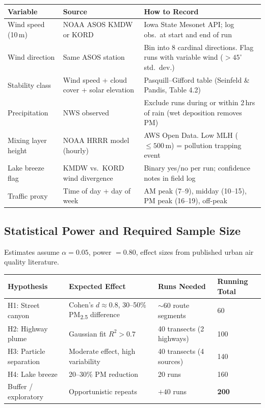 \documentclass[11pt, letterpaper]{article}
\begin{document}
\medskip
\begin{center}
\begin{tabular}{L{3.2cm} L{3.8cm} L{6.0cm}}
\toprule
{}
\color{white}\textbf{Variable} &
\color{white}\textbf{Source} &
\color{white}\textbf{How to Record} \\
\midrule
Wind speed (10\,m) &
NOAA ASOS KMDW or KORD &
Iowa State Mesonet API; log obs.\ at start and end of run \\
Wind direction &
Same ASOS station &
Bin into 8 cardinal directions. Flag runs with variable wind ($>45^\circ$ std.\ dev.) \\
Stability class &
Wind speed + cloud cover + solar elevation &
Pasquill--Gifford table (Seinfeld \& Pandis, Table 4.2) \\
Precipitation &
NWS observed &
Exclude runs during or within 2\,hrs of rain (wet deposition removes PM) \\
Mixing layer height &
NOAA HRRR model (hourly) &
AWS Open Data. Low MLH ($\leq 500$\,m) = pollution trapping event \\
Lake breeze flag &
KMDW vs.\ KORD wind divergence &
Binary yes/no per run; confidence notes in field log \\
Traffic proxy &
Time of day + day of week &
AM peak (7--9), midday (10--15), PM peak (16--19), off-peak \\
\bottomrule
\end{tabular}
\end{center}

\subsection{Statistical Power and Required Sample Size}

Estimates assume $\alpha = 0.05$, power $= 0.80$, effect sizes from published urban air quality
literature.

\medskip
\begin{center}
\begin{tabular}{L{3.0cm} L{3.8cm} L{2.8cm} C{2.0cm}}
\toprule
{}
\color{white}\textbf{Hypothesis} &
\color{white}\textbf{Expected Effect} &
\color{white}\textbf{Runs Needed} &
\color{white}\textbf{Running Total} \\
\midrule
H1: Street canyon &
Cohen's $d \approx 0.8$, 30--50\% PM\textsubscript{2.5} difference &
$\sim$60 route segments &
60 \\
H2: Highway plume &
Gaussian fit $R^2 > 0.7$ &
40 transects (2 highways) &
100 \\
H3: Particle separation &
Moderate effect, high variability &
40 transects (4 sources) &
140 \\
H4: Lake breeze &
20--30\% PM reduction &
20 runs &
160 \\
Buffer / exploratory &
Opportunistic repeats &
$+40$ runs &
\textbf{200} \\
\bottomrule
\end{tabular}
\end{center}
\end{document}
